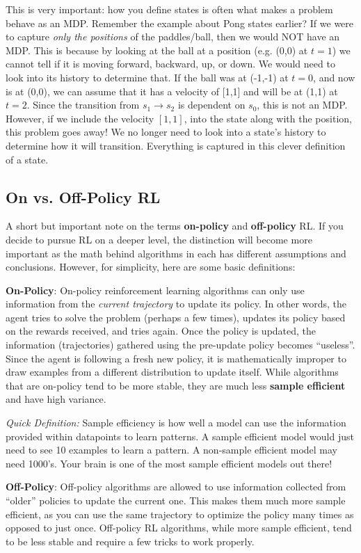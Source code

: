 \begin{flushleft}
    This is very important: how you define states is often what makes a problem behave as an MDP. Remember the example about Pong states earlier? If we were to capture \textit{only the positions} of the paddles/ball, then we would NOT have an MDP. This is because by looking at the ball at a position (e.g. (0,0) at $t=1$) we cannot tell if it is moving forward, backward, up, or down. We would need to look into its history to determine that. If the ball was at (-1,-1) at $t=0$, and now is at (0,0), we can assume that it has a velocity of [1,1] and will be at (1,1) at $t=2$. Since the transition from $s_1 \rightarrow s_2$ is dependent on $s_0$, this is not an MDP. However, if we include the velocity $[1,1]$, into the state along with the position, this problem goes away! We no longer need to look into a state's history to determine how it will transition. Everything is captured in this clever definition of a state.
    \end{flushleft}

\subsection{On vs. Off-Policy RL}
\begin{flushleft}
    \large A short but important note on the terms \textbf{on-policy} and \textbf{off-policy} RL. If you decide to pursue RL on a deeper level, the distinction will become more important as the math behind algorithms in each has different assumptions and conclusions. However, for simplicity, here are some basic definitions: \break

    \textbf{On-Policy}: On-policy reinforcement learning algorithms can only use information from the \textit{current trajectory} to update its policy. In other words, the agent tries to solve the problem (perhaps a few times), updates its policy based on the rewards received, and tries again. Once the policy is updated, the information (trajectories) gathered using the pre-update policy becomes ``useless''. Since the agent is following a fresh new policy, it is mathematically improper to draw examples from a different distribution to update itself. While algorithms that are on-policy tend to be more stable, they are much less \textbf{sample efficient} and have high variance. \break
    
    \textit{Quick Definition:} Sample efficiency is how well a model can use the information provided within datapoints to learn patterns. A sample efficient model would just need to see 10 examples to learn a pattern. A non-sample efficient model may need 1000's. Your brain is one of the most sample efficient models out there! \break

    \textbf{Off-Policy}: Off-policy algorithms are allowed to use information collected from ``older'' policies to update the current one. This makes them much more sample efficient, as you can use the same trajectory to optimize the policy many times as opposed to just once. Off-policy RL algorithms, while more sample efficient, tend to be less stable and require a few tricks to work properly.
\end{flushleft}

